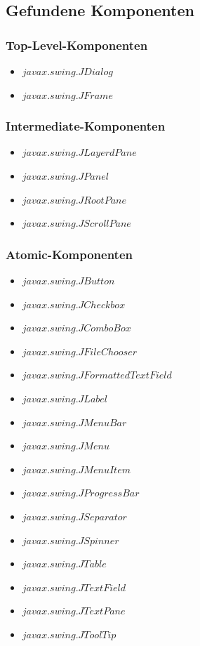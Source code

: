   \subsection{Gefundene Komponenten}
  
  \subsubsection{Top-Level-Komponenten}
  
  \begin{itemize}
    \item \(javax.swing.JDialog\)
    \item \(javax.swing.JFrame\)
  \end{itemize}
  
  \subsubsection{Intermediate-Komponenten}
  
  \begin{itemize}
    \item \(javax.swing.JLayerdPane\)
    \item \(javax.swing.JPanel\)
    \item \(javax.swing.JRootPane\)
    \item \(javax.swing.JScrollPane\)
  \end{itemize}
  
  \subsubsection{Atomic-Komponenten}
  
  \begin{itemize}
    \item \(javax.swing.JButton\)
    \item \(javax.swing.JCheckbox\)
    \item \(javax.swing.JComboBox\)
    \item \(javax.swing.JFileChooser\)
    \item \(javax.swing.JFormattedTextField\)
    \item \(javax.swing.JLabel\)
    \item \(javax.swing.JMenuBar\)
    \item \(javax.swing.JMenu\)
    \item \(javax.swing.JMenuItem\)
    \item \(javax.swing.JProgressBar\)
    \item \(javax.swing.JSeparator\)
    \item \(javax.swing.JSpinner\)
    \item \(javax.swing.JTable\)
    \item \(javax.swing.JTextField\)
    \item \(javax.swing.JTextPane\)
    \item \(javax.swing.JToolTip\)
  \end{itemize}
  
